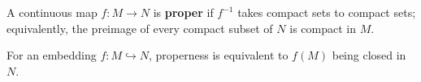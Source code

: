 A continuous map $f: M \to N$ is \textbf{proper} if $f^{-1}$ takes compact sets to compact sets; equivalently, the preimage of every compact subset of $N$ is compact in $M$.

For an embedding $f: M \hookrightarrow N$, properness is equivalent to $f(M)$ being closed in $N$.
